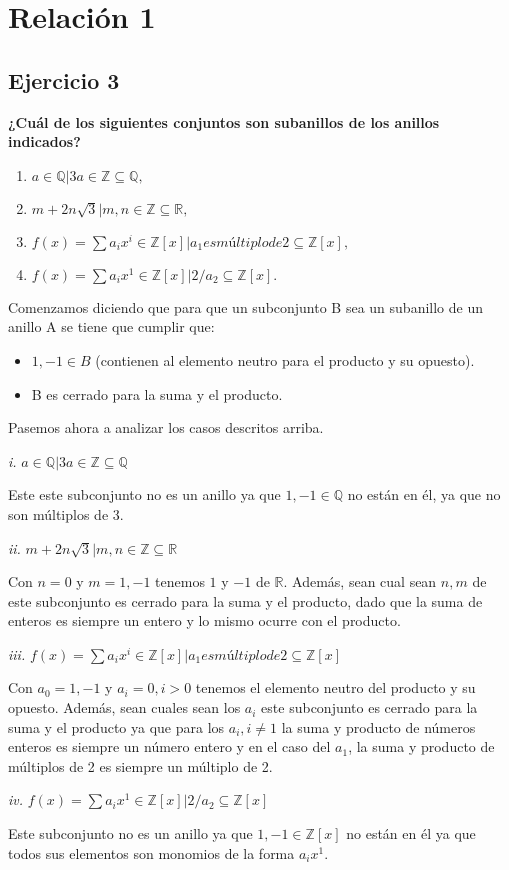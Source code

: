 \section{\Huge{Relación 1}}

\subsection{\LARGE{Ejercicio 3}}

\textbf{¿Cuál de los siguientes conjuntos son subanillos de los anillos indicados?}

\begin{enumerate}
  \item ${a \in \mathbb{Q} | 3a \in \mathbb{Z}} \subseteq \mathbb{Q},$
  \item ${m + 2n\sqrt{3} | m, n \in \mathbb{Z}} \subseteq \mathbb{R},$
  \item $ {f(x) = \sum a_ix^i \in \mathbb{Z}[x] | a_1 es múltiplo de 2} \subseteq \mathbb{Z}[x],$
  \item $ {f(x) = \sum a_ix^1 \in \mathbb{Z}[x] | 2 / a_2} \subseteq \mathbb{Z}[x].$
\end{enumerate}

Comenzamos diciendo que para que un subconjunto B sea un subanillo de un anillo A se tiene que cumplir que:

\begin{itemize}
  \item $1, -1 \in B$ (contienen al elemento neutro para el producto y su opuesto).
  \item B es cerrado para la suma y el producto.
\end{itemize}

Pasemos ahora a analizar los casos descritos arriba.

\textit{i.} ${a \in \mathbb{Q} | 3a \in \mathbb{Z}} \subseteq \mathbb{Q}$

Este este subconjunto no es un anillo ya que $1, -1 \in \mathbb{Q}$ no están en él, ya que no son múltiplos de 3.

\textit{ii.} ${m + 2n\sqrt{3} | m, n \in \mathbb{Z}} \subseteq \mathbb{R}$

Con $n = 0$ y $m = 1, -1$ tenemos $1$ y $-1$ de $\mathbb{R}$. Además, sean cual sean $n, m$ de  este subconjunto es cerrado para la suma y el producto, dado que la suma de enteros es siempre un entero y lo mismo ocurre con el producto.

\textit{iii.} $ {f(x) = \sum a_ix^i \in \mathbb{Z}[x] | a_1 es múltiplo de 2} \subseteq \mathbb{Z}[x]$

Con $a_0 = 1, -1$ y $a_i = 0, i > 0$ tenemos el elemento neutro del producto y su opuesto. Además, sean cuales sean los $a_i$ este subconjunto es cerrado para la suma y el producto ya que para los $a_i, i \neq 1$ la suma y producto de números enteros es siempre un número entero y en el caso del $a_1$, la suma y producto de múltiplos de 2 es siempre un múltiplo de 2.

\textit{iv.} $ {f(x) = \sum a_ix^1 \in \mathbb{Z}[x] | 2 / a_2} \subseteq \mathbb{Z}[x]$

Este subconjunto no es un anillo ya que $1, -1 \in \mathbb{Z}[x]$ no están en él ya que todos sus elementos son monomios de la forma $a_ix^1$. 
